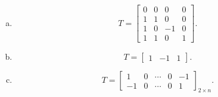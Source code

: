 \begin{Exercise}
\begin{enumerate}[a)]
\item 
\begin{solution}
$$ T = \begin{bmatrix}
  0 & 0 & 0 & 0 \\
  1 & 1 & 0 & 0 \\
  1 & 0 & -1 & 0 \\
  1 & 1 & 0 & 1
\end{bmatrix}.
$$
\end{solution}

\item
\begin{solution}
$$ T = \begin{bmatrix}
1 & -1 & 1
\end{bmatrix}.
$$
\end{solution}

\item
\begin{solution}
$$ T = \begin{bmatrix}
1 & 0 & \cdots & 0 & -1 \\
-1 & 0 & \cdots & 0 & 1
\end{bmatrix}_{2\times n}.
$$
\end{solution}
\end{enumerate}
\end{Exercise}
